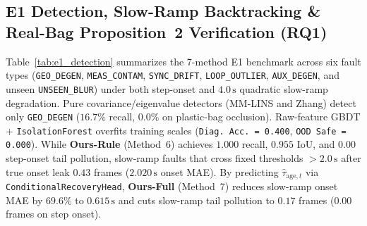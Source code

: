 \documentclass[journal]{IEEEtran}
\begin{document}
\begin{table}[!t]
\centering
\caption{E1 Detection, Slow-Ramp Onset Backtracking \& Diagnosis Benchmark Across 6 Fault Scenarios $\times$ 5 Seeds (30 Step + 30 Slow-Ramp Runs)}
\label{tab:e1_detection}
\renewcommand{\arraystretch}{1.15}
\end{table}

\subsection{E1 Detection, Slow-Ramp Backtracking \& Real-Bag Proposition~2 Verification (RQ1)}
Table~\ref{tab:e1_detection} summarizes the 7-method E1 benchmark across six fault types (\texttt{GEO\_DEGEN}, \texttt{MEAS\_CONTAM}, \texttt{SYNC\_DRIFT}, \texttt{LOOP\_OUTLIER}, \texttt{AUX\_DEGEN}, and unseen \texttt{UNSEEN\_BLUR}) under both step-onset and $4.0\,\mathrm{s}$ quadratic slow-ramp degradation. Pure covariance/eigenvalue detectors (MM-LINS and Zhang) detect only \texttt{GEO\_DEGEN} ($16.7\%$ recall, $0.0\%$ on plastic-bag occlusion). Raw-feature GBDT + \texttt{IsolationForest} overfits training scales (\texttt{Diag.\ Acc.\ = 0.400}, \texttt{OOD Safe = 0.000}). While \textbf{Ours-Rule} (Method~6) achieves $1.000$ recall, $0.955$ IoU, and $0.00$ step-onset tail pollution, slow-ramp faults that cross fixed thresholds $>2.0\,\mathrm{s}$ after true onset leak $0.43$ frames ($2.020\,\mathrm{s}$ onset MAE). By predicting $\hat{\tau}_{\mathrm{age},t}$ via \texttt{Conditional\allowbreak Recovery\allowbreak Head}, \textbf{Ours-Full} (Method~7) reduces slow-ramp onset MAE by $69.6\%$ to $\mathbf{0.615\,\mathrm{s}}$ and cuts slow-ramp tail pollution to $\mathbf{0.17}$ frames ($0.00$ frames on step onset).
\end{document}
